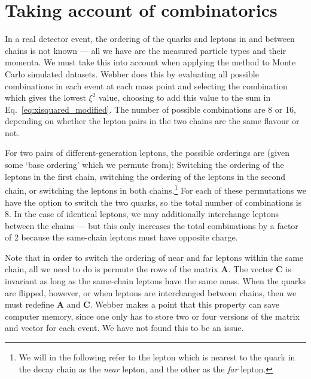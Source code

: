 \documentclass[twoside,english]{uiofysmaster}
\begin{document}
\section{Taking account of combinatorics}
\label{sec:combinatorics}
In a real detector event, the ordering of the quarks and leptons in and between chains is not known --- all we have are the measured particle types and their momenta. We must take this into account when applying the method to Monte Carlo simulated datasets. Webber does this by evaluating all possible combinations in each event at each mass point and selecting the combination which gives the lowest $\xi^2$ value, choosing to add this value to the sum in Eq.\ \eqref{eq:xisquared_modified}. The number of possible combinations are 8 or 16, depending on whether the lepton pairs in the two chains are the same flavour or not. 

For two pairs of different-generation leptons, the possible orderings are (given some `base ordering' which we permute from): Switching the ordering of the leptons in the first chain, switching the ordering of the leptons in the second chain, or switching the leptons in both chains.\footnote{We will in the following refer to the lepton which is nearest to the quark in the decay chain as the {\it near} lepton, and the other as the {\it far} lepton.} For each of these permutations we have the option to switch the two quarks, so the total number of combinations is 8. In the case of identical leptons, we may additionally interchange leptons between the chains --- but this only increases the total combinations by a factor of 2 because the same-chain leptons must have opposite charge.

Note that in order to switch the ordering of near and far leptons within the same chain, all we need to do is permute the rows of the matrix $\mathbf{A}$. The vector $\mathbf{C}$ is invariant as long as the same-chain leptons have the same mass. When the quarks are flipped, however, or when leptons are interchanged between chains, then we must redefine $\mathbf{A}$ and $\mathbf{C}$. Webber makes a point that this property can save computer memory, since one only has to store two or four versions of the matrix and vector for each event. We have not found this to be an issue.
\end{document}
